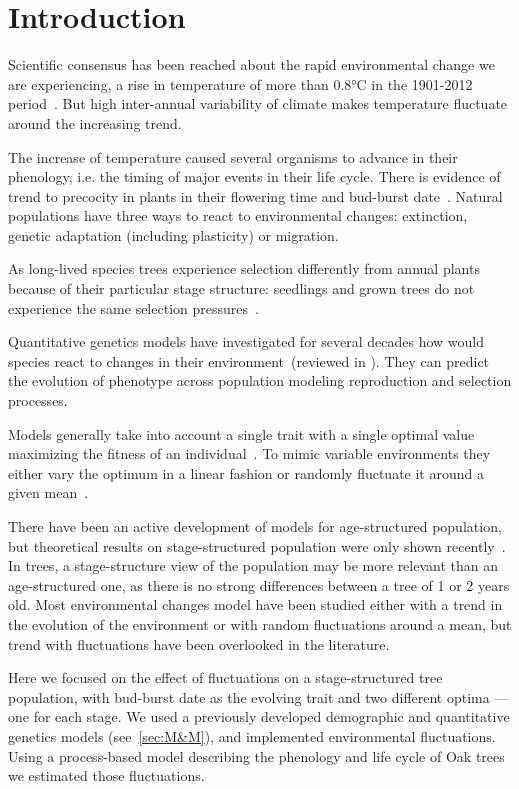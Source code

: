 \label{sec:Intro}
\section*{Introduction}

Scientific consensus has been reached about the rapid environmental change we are experiencing, a rise in temperature of more than 0.8°C in the 1901-2012 period~\citep{stocker_ipcc_2013}. But high inter-annual variability of climate makes temperature fluctuate around the increasing trend.

The increase of temperature caused several organisms to advance in their phenology, i.e. the timing of major events in their life cycle. There is evidence of trend to precocity in plants in their flowering time and bud-burst date~\citep{alberto_adaptive_2011, gienapp_predicting_2013}. Natural populations have three ways to react to environmental changes: extinction, genetic adaptation (including plasticity) or migration.

As long-lived species trees experience selection differently from annual plants because of their particular stage structure: seedlings and grown trees do not experience the same selection pressures~\citep{lande_quantitative_1982, coulson_dynamics_2008, barfield_evolution_2011, engen_evolution_2011}.

Quantitative genetics models have investigated for several decades how would species react to changes in their environment~(reviewed in \citealt{burger_quantitative-genetic_2004}). They can predict the evolution of phenotype across population modeling reproduction and selection processes.

Models generally take into account a single trait with a single optimal value maximizing the fitness of an individual~\citep{lande_quantitative_1982}. To mimic variable environments they either vary the optimum in a linear fashion or randomly fluctuate it around a given mean~\citep{lande_role_1996}.

There have been an active development of models for age-structured population, but theoretical results on stage-structured population were only shown recently~\citep{engen_evolution_2011}. In trees, a stage-structure view of the population may be more relevant than an age-structured one, as there is no strong differences between a tree of 1 or 2 years old. Most environmental changes model have been studied either with a trend in the evolution of the environment or with random fluctuations around a mean, but trend with fluctuations have been overlooked in the literature.

Here we focused on the effect of fluctuations on a stage-structured tree population, with bud-burst date as the evolving trait and two different optima — one for each stage.
We used a previously developed demographic and quantitative genetics models (see~\autoref{sec:M&M}), and implemented environmental fluctuations. Using a process-based model describing the phenology and life cycle of Oak trees we estimated those fluctuations.